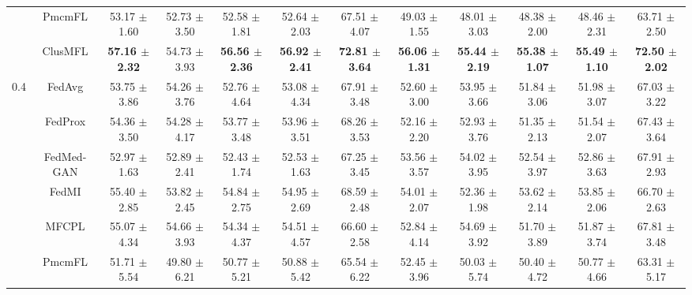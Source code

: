 \begin{table*}[t]
{\begin{tabular}{cccccccccccc}
                          & PmcmFL                  & 53.17 $\pm$ 1.60          & 52.73 $\pm$ 3.50          & 52.58 $\pm$ 1.81          & 52.64 $\pm$ 2.03          & 67.51 $\pm$ 4.07          & 49.03 $\pm$ 1.55      & 48.01 $\pm$ 3.03      & 48.38 $\pm$ 2.00      & 48.46 $\pm$ 2.31      & 63.71 $\pm$ 2.50      \\
                          & ClusMFL                    & \textbf{57.16 $\pm$ 2.32}     & 54.73 $\pm$ 3.93              & \textbf{56.56 $\pm$ 2.36}     & \textbf{56.92 $\pm$ 2.41}     & \textbf{72.81 $\pm$ 3.64}     & \textbf{56.06 $\pm$ 1.31} & \textbf{55.44 $\pm$ 2.19} & \textbf{55.38 $\pm$ 1.07} & \textbf{55.49 $\pm$ 1.10} & \textbf{72.50 $\pm$ 2.02} \\ \hline
\multirow{7}{*}{0.4}      & FedAvg                  & 53.75 $\pm$ 3.86          & 54.26 $\pm$ 3.76          & 52.76 $\pm$ 4.64          & 53.08 $\pm$ 4.34          & 67.91 $\pm$ 3.48          & 52.60 $\pm$ 3.00      & 53.95 $\pm$ 3.66      & 51.84 $\pm$ 3.06      & 51.98 $\pm$ 3.07      & 67.03 $\pm$ 3.22      \\
                          & FedProx                 & 54.36 $\pm$ 3.50          & 54.28 $\pm$ 4.17          & 53.77 $\pm$ 3.48          & 53.96 $\pm$ 3.51          & 68.26 $\pm$ 3.53          & 52.16 $\pm$ 2.20      & 52.93 $\pm$ 3.76      & 51.35 $\pm$ 2.13      & 51.54 $\pm$ 2.07      & 67.43 $\pm$ 3.64      \\
                          & FedMed-GAN              & 52.97 $\pm$ 1.63          & 52.89 $\pm$ 2.41          & 52.43 $\pm$ 1.74          & 52.53 $\pm$ 1.63          & 67.25 $\pm$ 3.45          & 53.56 $\pm$ 3.57      & 54.02 $\pm$ 3.95      & 52.54 $\pm$ 3.97      & 52.86 $\pm$ 3.63      & 67.91 $\pm$ 2.93      \\
                          & FedMI                   & 55.40 $\pm$ 2.85          & 53.82 $\pm$ 2.45          & 54.84 $\pm$ 2.75          & 54.95 $\pm$ 2.69          & 68.59 $\pm$ 2.48          & 54.01 $\pm$ 2.07      & 52.36 $\pm$ 1.98      & 53.62 $\pm$ 2.14      & 53.85 $\pm$ 2.06      & 66.70 $\pm$ 2.63      \\
                          & MFCPL                   & 55.07 $\pm$ 4.34          & 54.66 $\pm$ 3.93          & 54.34 $\pm$ 4.37          & 54.51 $\pm$ 4.57          & 66.60 $\pm$ 2.58          & 52.84 $\pm$ 4.14      & 54.69 $\pm$ 3.92      & 51.70 $\pm$ 3.89      & 51.87 $\pm$ 3.74      & 67.81 $\pm$ 3.48      \\
                          & PmcmFL                  & 51.71 $\pm$ 5.54          & 49.80 $\pm$ 6.21          & 50.77 $\pm$ 5.21          & 50.88 $\pm$ 5.42          & 65.54 $\pm$ 6.22          & 52.45 $\pm$ 3.96      & 50.03 $\pm$ 5.74      & 50.40 $\pm$ 4.72      & 50.77 $\pm$ 4.66      & 63.31 $\pm$ 5.17      \\

\end{tabular}}
\end{table*}
